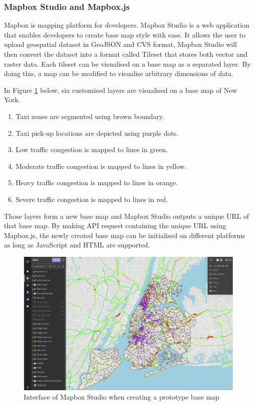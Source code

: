 \documentclass[doc,natbib]{apa6}
\begin{document}
\subsubsection{Mapbox Studio and Mapbox.js}\hfil\newline
Mapbox is mapping platform for developers. Mapbox Studio is a web application that enables developers to create base map style with ease. It allows the user to upload geospatial dataset in GeoJSON and CVS format, Mapbox Studio will then convert the dataset into a format called Tileset that stores both vector and raster data. Each tileset can be visualised on a base map as a separated layer. By doing this, a map can be modified to visualise arbitrary dimensions of data. 

In Figure \ref{fig:7} below, six customised layers are visualised on a base map of New York.
\begin{enumerate}
	\item Taxi zones are segmented using brown boundary.
	\item Taxi pick-up locations are depicted using purple dots.
	\item Low traffic congestion is mapped to lines in green.
	\item Moderate traffic congestion is mapped to lines in yellow.
	\item Heavy traffic congestion is mapped to lines in orange.
	\item Severe traffic congestion is mapped to lines in red.
\end{enumerate}

Those layers form a new base map and Mapbox Studio outputs a unique URL of that base map. By making API request containing the unique URL using Mapbox.js, the newly created base map can be initialised on different platforms as long as JavaScript and HTML are supported.

\begin{figure}[H]
	\centering
	\includegraphics{figures/fig7.png}
	\caption{\label{fig:7}Interface of Mapbox Studio when creating a prototype base map \citep{Mapbox2017}}
\end{figure}
\end{document}

